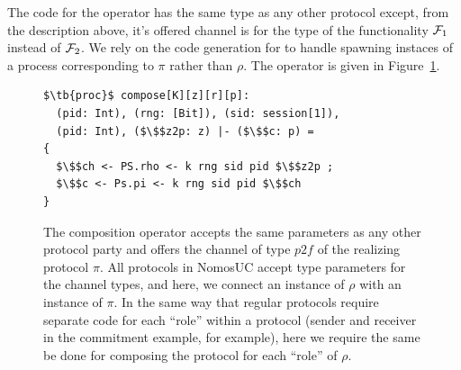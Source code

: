 The code for the operator has the same type as any other protocol except, from the description above, it's offered channel is for the type of the functionality $\mathcal{F}_1$ instead of $\mathcal{F}_2$.
We rely on the code generation for to handle spawning instaces of a  process corresponding to $\pi$ rather than $\rho$.
The operator is given in Figure~\ref{lst:compose}.
\begin{figure}
\begin{lstlisting}[basicstyle=\small\BeraMonottFamily, frame=single, mathescape]
$\tb{proc}$ compose[K][z][r][p]:
  (pid: Int), (rng: [Bit]), (sid: session[1]),
  (pid: Int), ($\$$z2p: z) |- ($\$$c: p) =
{
  $\$$ch <- PS.rho <- k rng sid pid $\$$z2p ;
  $\$$c <- Ps.pi <- k rng sid pid $\$$ch 
}
\end{lstlisting}
\caption{The composition operator accepts the same parameters as any other protocol party and offers the channel of type $p2f$ of the realizing protocol $\pi$. All protocols in NomosUC accept type parameters for the channel types, and here, we connect an instance of $\rho$ with an instance of $\pi$. In the same way that regular protocols require separate code for each ``role'' within a protocol (sender and receiver in the commitment example, for example), here we require the same be done for composing the protocol for each ``role'' of $\rho$.}
\label{lst:compose}
\end{figure}

